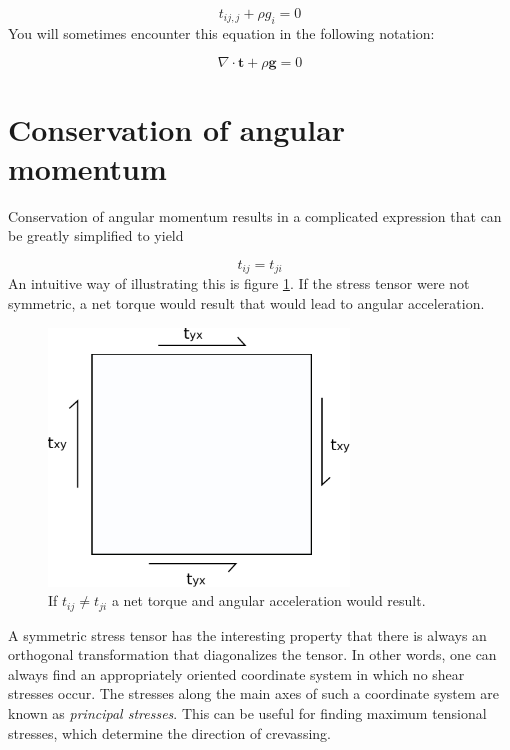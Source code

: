 \documentclass[12pt, openany]{memoir}
\begin{document}
\begin{equation}
t_{ij,j} + \rho g_i = 0
\end{equation}
You will sometimes encounter this equation in the following notation:

\begin{equation}
\nabla \cdot \mathbf{t} + \rho \mathbf{g} = 0
\end{equation}

\section{Conservation of angular momentum}

Conservation of angular momentum results in a complicated expression
that can be greatly simplified to yield

\begin{equation}
t_{ij} = t_{ji}
\end{equation}
An intuitive way of illustrating this is figure \ref{fig:angular}. If
the stress tensor were not symmetric, a net torque would result that
would lead to angular acceleration.

\begin{figure}
\includegraphics[width=8cm]{rotation}
\caption{\label{fig:angular} If $t_{ij} \ne t_{ji}$ a net torque and
  angular acceleration would result.}
\end{figure}

A symmetric stress tensor has the interesting property that there is
always an orthogonal transformation that diagonalizes the tensor. In
other words, one can always find an appropriately oriented coordinate
system in which no shear stresses occur. The stresses along the main
axes of such a coordinate system are known as \emph{principal
  stresses}. This can be useful for finding maximum tensional
stresses, which determine the direction of crevassing.
\end{document}
